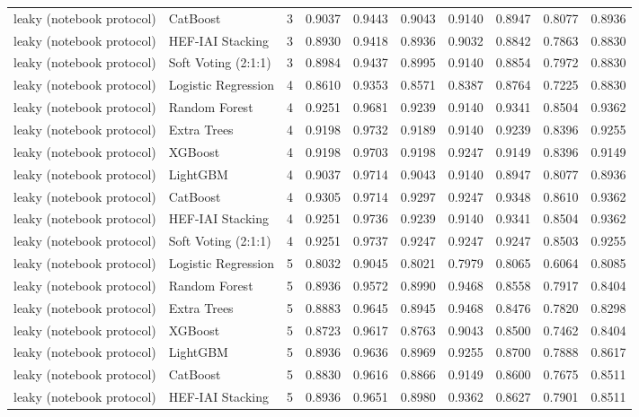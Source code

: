 \begin{tabular}{llrrrrrrrr}
leaky (notebook protocol) & CatBoost & 3 & 0.9037 & 0.9443 & 0.9043 & 0.9140 & 0.8947 & 0.8077 & 0.8936 \\
leaky (notebook protocol) & HEF-IAI Stacking & 3 & 0.8930 & 0.9418 & 0.8936 & 0.9032 & 0.8842 & 0.7863 & 0.8830 \\
leaky (notebook protocol) & Soft Voting (2:1:1) & 3 & 0.8984 & 0.9437 & 0.8995 & 0.9140 & 0.8854 & 0.7972 & 0.8830 \\
leaky (notebook protocol) & Logistic Regression & 4 & 0.8610 & 0.9353 & 0.8571 & 0.8387 & 0.8764 & 0.7225 & 0.8830 \\
leaky (notebook protocol) & Random Forest & 4 & 0.9251 & 0.9681 & 0.9239 & 0.9140 & 0.9341 & 0.8504 & 0.9362 \\
leaky (notebook protocol) & Extra Trees & 4 & 0.9198 & 0.9732 & 0.9189 & 0.9140 & 0.9239 & 0.8396 & 0.9255 \\
leaky (notebook protocol) & XGBoost & 4 & 0.9198 & 0.9703 & 0.9198 & 0.9247 & 0.9149 & 0.8396 & 0.9149 \\
leaky (notebook protocol) & LightGBM & 4 & 0.9037 & 0.9714 & 0.9043 & 0.9140 & 0.8947 & 0.8077 & 0.8936 \\
leaky (notebook protocol) & CatBoost & 4 & 0.9305 & 0.9714 & 0.9297 & 0.9247 & 0.9348 & 0.8610 & 0.9362 \\
leaky (notebook protocol) & HEF-IAI Stacking & 4 & 0.9251 & 0.9736 & 0.9239 & 0.9140 & 0.9341 & 0.8504 & 0.9362 \\
leaky (notebook protocol) & Soft Voting (2:1:1) & 4 & 0.9251 & 0.9737 & 0.9247 & 0.9247 & 0.9247 & 0.8503 & 0.9255 \\
leaky (notebook protocol) & Logistic Regression & 5 & 0.8032 & 0.9045 & 0.8021 & 0.7979 & 0.8065 & 0.6064 & 0.8085 \\
leaky (notebook protocol) & Random Forest & 5 & 0.8936 & 0.9572 & 0.8990 & 0.9468 & 0.8558 & 0.7917 & 0.8404 \\
leaky (notebook protocol) & Extra Trees & 5 & 0.8883 & 0.9645 & 0.8945 & 0.9468 & 0.8476 & 0.7820 & 0.8298 \\
leaky (notebook protocol) & XGBoost & 5 & 0.8723 & 0.9617 & 0.8763 & 0.9043 & 0.8500 & 0.7462 & 0.8404 \\
leaky (notebook protocol) & LightGBM & 5 & 0.8936 & 0.9636 & 0.8969 & 0.9255 & 0.8700 & 0.7888 & 0.8617 \\
leaky (notebook protocol) & CatBoost & 5 & 0.8830 & 0.9616 & 0.8866 & 0.9149 & 0.8600 & 0.7675 & 0.8511 \\
leaky (notebook protocol) & HEF-IAI Stacking & 5 & 0.8936 & 0.9651 & 0.8980 & 0.9362 & 0.8627 & 0.7901 & 0.8511 \\

\end{tabular}
